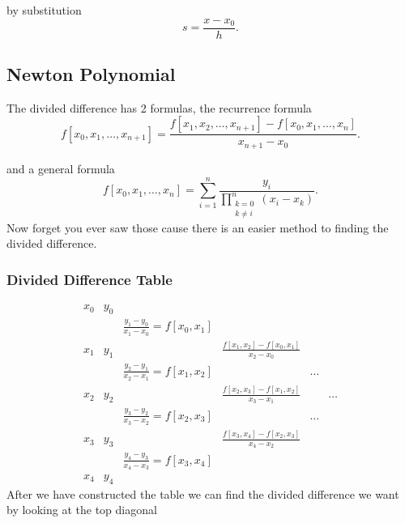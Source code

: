 \documentclass{report}
\begin{document}
by substitution
\[
	s = \frac{x-x_0}{h}
	.\]

\subsection{Newton Polynomial}


The divided difference has 2 formulas, the recurrence formula
\[
	f[x_0,x_1,\dots,x_{n+1}] = \frac{f[x_1,x_2,\dots,x_{n+1}]-f[x_0,x_1,\dots,x_{n}]}{x_{n+1}-x_0}
	.\]

and a general formula
\[
	f[x_0,x_1,\dots,x_n] = \sum_{i=1}^{n}\frac{y_i }{\prod_{\substack{k=0\\k\neq i}}^{n} (x_i - x_k)}
	.\]
Now forget you ever saw those cause there is an easier method to finding the divided difference.

\subsubsection{Divided Difference Table}
\[
	\begin{array}{cccccc}
		x_0 & y_0                                                                                              \\
		    &     & \frac{y_1-y_0}{x_1-x_0}=f[x_0,x_1]                                                         \\
		x_1 & y_1 &                                    & \frac{f[x_1,x_2]-f[x_0,x_1]}{x_2-x_0}                 \\
		    &     & \frac{y_2-y_1}{x_2-x_1}=f[x_1,x_2] &                                       & \dots         \\
		x_2 & y_2 &                                    & \frac{f[x_2,x_3]-f[x_1,x_2]}{x_3-x_1} &       & \dots \\
		    &     & \frac{y_3-y_2}{x_3-x_2}=f[x_2,x_3] &                                       & \dots         \\
		x_3 & y_3 &                                    & \frac{f[x_3,x_4]-f[x_2,x_3]}{x_4-x_2}                 \\
		    &     & \frac{y_4-y_3}{x_4-x_3}=f[x_3,x_4]                                                         \\
		x_4 & y_4
	\end{array}
\]
After we have constructed the table we can find the divided difference we want by looking at the top diagonal
\end{document}
